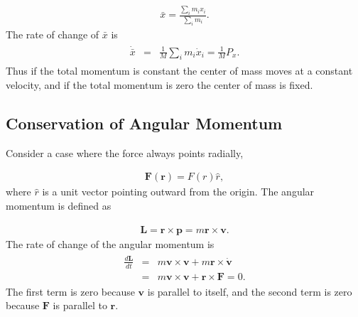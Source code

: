 \documentclass[letterpaper,10pt,english]{sphinxmanual}
\begin{document}
\begin{equation*}
\begin{split}
\begin{equation}
\bar{x}=\frac{\sum_im_ix_i}{\sum_i m_i}.
\label{_auto8} \tag{8}
\end{equation}
\end{split}
\end{equation*}
The rate of change of \(\bar{x}\) is
\begin{equation*}
\begin{split}
\begin{eqnarray}
\dot{\bar{x}}&=&\frac{1}{M}\sum_i m_i\dot{x}_i=\frac{1}{M}P_x.
\end{eqnarray}
\end{split}
\end{equation*}
Thus if the total momentum is constant the center of mass moves at a
constant velocity, and if the total momentum is zero the center of
mass is fixed.


\subsection{Conservation of Angular Momentum}
\label{\detokenize{chapter3:conservation-of-angular-momentum}}
Consider a case where the force always points radially,




\begin{equation*}
\begin{split}
\begin{equation}
\boldsymbol{F}(\boldsymbol{r})=F(r)\hat{r},
\label{_auto9} \tag{9}
\end{equation}
\end{split}
\end{equation*}
where \(\hat{r}\) is a unit vector pointing outward from the origin. The angular momentum is defined as




\begin{equation*}
\begin{split}
\begin{equation}
\boldsymbol{L}=\boldsymbol{r}\times\boldsymbol{p}=m\boldsymbol{r}\times\boldsymbol{v}.
\label{_auto10} \tag{10}
\end{equation}
\end{split}
\end{equation*}
The rate of change of the angular momentum is
\begin{equation*}
\begin{split}
\begin{eqnarray}
\frac{d\boldsymbol{L}}{dt}&=&m\boldsymbol{v}\times\boldsymbol{v}+m\boldsymbol{r}\times\dot{\boldsymbol{v}}\\
\nonumber
&=&m\boldsymbol{v}\times\boldsymbol{v}+\boldsymbol{r}\times{\boldsymbol{F}}=0.
\end{eqnarray}
\end{split}
\end{equation*}
The first term is zero because \(\boldsymbol{v}\) is parallel to itself, and the
second term is zero because \(\boldsymbol{F}\) is parallel to \(\boldsymbol{r}\).
\end{document}
